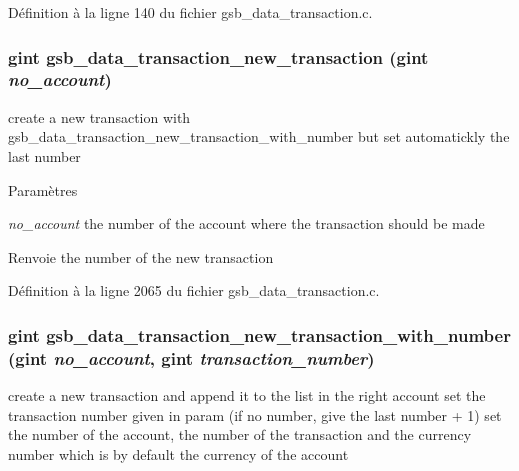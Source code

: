 Définition à la ligne 140 du fichier gsb\_\-data\_\-transaction.c.

\subsubsection[{gsb\_\-data\_\-transaction\_\-new\_\-transaction}]{\setlength{\rightskip}{0pt plus 5cm}gint gsb\_\-data\_\-transaction\_\-new\_\-transaction (gint {\em no\_\-account})}\label{gsb__data__transaction_8h_af65a20fc0270cbfbc5d69f5d55da8112}
create a new transaction with gsb\_\-data\_\-transaction\_\-new\_\-transaction\_\-with\_\-number but set automatickly the last number


\begin{DoxyParams}{Paramètres}
\item[{\em no\_\-account}]the number of the account where the transaction should be made\end{DoxyParams}
\begin{DoxyReturn}{Renvoie}
the number of the new transaction 
\end{DoxyReturn}


Définition à la ligne 2065 du fichier gsb\_\-data\_\-transaction.c.

\subsubsection[{gsb\_\-data\_\-transaction\_\-new\_\-transaction\_\-with\_\-number}]{\setlength{\rightskip}{0pt plus 5cm}gint gsb\_\-data\_\-transaction\_\-new\_\-transaction\_\-with\_\-number (gint {\em no\_\-account}, \/  gint {\em transaction\_\-number})}\label{gsb__data__transaction_8h_afc9fc27f5219a49d80fb0922c904439d}
create a new transaction and append it to the list in the right account set the transaction number given in param (if no number, give the last number + 1) set the number of the account, the number of the transaction and the currency number which is by default the currency of the account


